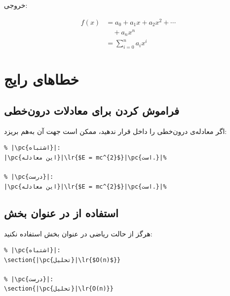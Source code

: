 خروجی:

\begin{align}
    f(x) &= a_{0} + a_{1}x + a_{2}x^{2} + \cdots \nonumber \\
         &\quad + a_{n}x^{n} \\
    &= \sum_{i=0}^{n} a_{i}x^{i}
\end{align}


\section{خطاهای رایج}
\label{sec:math-mistakes}

\subsection{فراموش کردن  برای معادلات درون‌خطی}
\label{sec:math-mistake-lr}

اگر معادله‌ی درون‌خطی را داخل  قرار
ندهید، ممکن است جهت آن به‌هم بریزد:

\begin{latin}
\begin{verbatim}
% |\pc{اشتباه}|:
|\pc{این معادله}|\lr{$E = mc^{2}$}|\pc{است.}|%

% |\pc{درست}|:
|\pc{این معادله}|\lr{$E = mc^{2}$}|\pc{است.}|%
\end{verbatim}
\end{latin}

\subsection{استفاده از  در عنوان بخش}
\label{sec:math-mistake-title}

هرگز از حالت ریاضی در عنوان بخش استفاده نکنید:

\begin{latin}
\begin{verbatim}
% |\pc{اشتباه}|:
\section{|\pc{تحلیل}|\lr{$O(n)$}}

% |\pc{درست}|:
\section{|\pc{تحلیل}|\lr{O(n)}}
\end{verbatim}
\end{latin}

